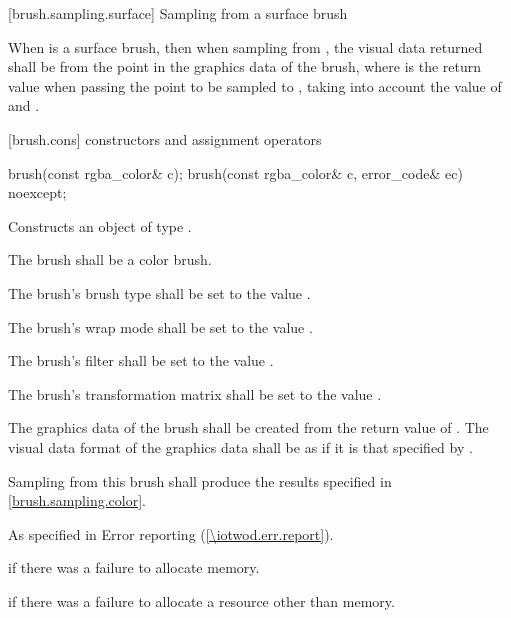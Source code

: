  [brush.sampling.surface] {Sampling from a surface brush}

\pnum
When  is a surface brush, then when sampling from , the visual data returned shall be from the point  in the graphics data of the brush, where  is the return value when passing the point to be sampled to , taking into account the value of  and .

 [brush.cons] { constructors and assignment operators}

\begin{itemdecl}
brush(const rgba_color& c);
brush(const rgba_color& c, error_code& ec) noexcept;
\end{itemdecl}
\begin{itemdescr}
\pnum
\effects
Constructs an object of type .

\pnum
The brush shall be a color brush.

\pnum
The brush's brush type shall be set to the value .

\pnum
The brush's wrap mode shall be set to the value .

\pnum
The brush's filter shall be set to the value .

\pnum
The brush's transformation matrix shall be set to the value .

\pnum
The graphics data of the brush shall be created from the return value of . The visual data format of the graphics data shall be as if it is that specified by .

\pnum
\remarks
Sampling from this brush shall produce the results specified in \ref{brush.sampling.color}.

\pnum
\throws
As specified in Error reporting (\ref{\iotwod.err.report}).

\pnum
\errors
{} if there was a failure to allocate memory.

 if there was a failure to allocate a resource other than memory.
\end{itemdescr}

